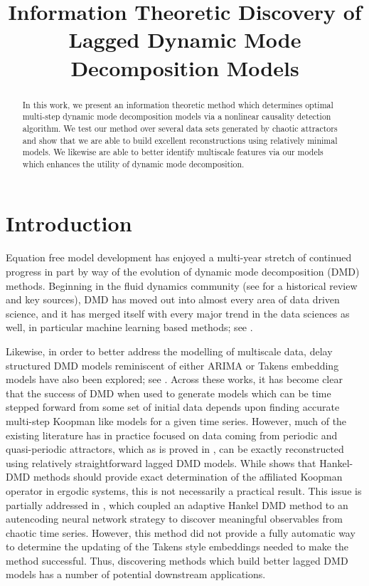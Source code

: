 \documentclass[a4paper,11pt]{article}
\title{Information Theoretic Discovery of Lagged Dynamic Mode Decomposition Models}
\date{}
\begin{document}
\maketitle

\begin{abstract}
In this work, we present an information theoretic method which determines optimal multi-step dynamic mode decomposition models via a nonlinear causality detection algorithm.  We test our method over several data sets generated by chaotic attractors and show that we are able to build excellent reconstructions using relatively minimal models.  We likewise are able to better identify multiscale features via our models which enhances the utility of dynamic mode decomposition.   
\end{abstract}

\section{Introduction}

Equation free model development has enjoyed a multi-year stretch of continued progress in part by way of the evolution of dynamic mode decomposition (DMD) methods.  Beginning in the fluid dynamics community (see \cite{taira} for a historical review and key sources), DMD has moved out into almost every area of data driven science, and it has merged itself with every major trend in the data sciences as well, in particular machine learning based methods; see \cite{lusch, azencot, lago_dldmd}.  

Likewise, in order to better address the modelling of multiscale data, delay structured DMD models reminiscent of either ARIMA or Takens embedding models have also been explored; see \cite{arbabi, clainche, duraisamy, champion2, kutz4, curtis_dldmd}.  Across these works, it has become clear that the success of DMD when used to generate models which can be time stepped forward from some set of initial data depends upon finding accurate multi-step Koopman like models for a given time series.  However, much of the existing literature has in practice focused on data coming from periodic and quasi-periodic attractors, which as is proved in \cite{duraisamy}, can be exactly reconstructed using relatively straightforward lagged DMD models.  While \cite{arbabi} shows that Hankel-DMD methods should provide exact determination of the affiliated Koopman operator in ergodic systems, this is not necessarily a practical result.  This issue is partially addressed in \cite{curtis_dldmd}, which coupled an adaptive Hankel DMD method to an autencoding neural network strategy to discover meaningful observables from chaotic time series.  However, this method did not provide a fully automatic way to determine the updating of the Takens style embeddings needed to make the method successful.  Thus, discovering methods which build better lagged DMD models has a number of potential downstream applications.  
\end{document}
